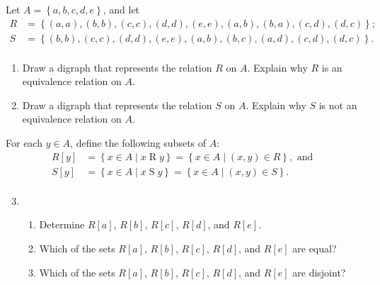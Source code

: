 \begin{previewactivity} \label{PA:setswithrelation} \hfill

Let  $A = \left\{ {a, b, c, d, e} \right\}$, and  let 
\[
\begin{aligned}
R &= \left\{ {( {a, a} ), ( {b, b} ), ( {c, c} ), ( {d, d} ), ( {e, e} ), ( {a, b} ), ( {b, a} ), ( {c, d} ), ( {d, c} )} \right\}; \\
S &= \left\{ { ( {b, b} ), ( {c, c} ), ( {d, d} ), ( {e, e} ), ( {a, b} ), ( {b, c} ), ( {a, d} ), ( {c, d} ), ( {d, c} )} \right\}. \\
\end{aligned}
\]

\begin{enumerate}
\item Draw a digraph that represents the relation  $R$  on  $A$.  Explain why  $R$  is an equivalence relation on  $A$.

\item Draw a digraph that represents the relation  $S$  on  $A$.  Explain why  $S$  is not an equivalence relation on  $A$.
\end{enumerate}
For each $y \in A$, define the following subsets of   $A$:
\[
\begin{aligned}
  R[ y ] &= \left\{ { {x \in A } \mid x \mathrel{R} y} \right\} = \left\{ { {x \in A } \mid \left( {x, y} \right) \in R} \right\}\!, \text{ and } \\
  S[ y ] &= \left\{ { {x \in A } \mid x \mathrel{S} y} \right\} = \left\{ { {x \in A } \mid \left( {x, y} \right) \in S} \right\}\!. \\ 
\end{aligned}
\]
\begin{enumerate} \setcounter{enumi}{2} \item \begin{enumerate}

\item Determine  $R[ a ]$, $R[ b ]$, $R[ c ]$, 
      $R[ d ]$, and $R[ e ]$.

\item Which of the sets  $R[ a ]$, $R[ b ]$, $R[ c ]$, 
      $R[ d ]$,  and $R[ e ]$ are equal?

\item Which of the sets  $R[ a ]$, $R[ b ]$, $R[ c ]$, 
      $R[ d ]$,  and $R[ e ]$ are disjoint?
\end{enumerate}


\end{enumerate}
\end{previewactivity}
